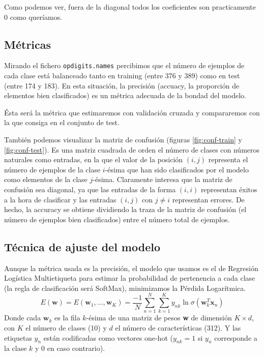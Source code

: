 \documentclass[a4]{article}
\begin{document}
Como podemos ver, fuera de la diagonal todos los coeficientes son
practicamente 0 como queríamos.

\subsection{Métricas}

Mirando el fichero \texttt{opdigits.names} percibimos que el número de
ejemplos de cada clase está balanceado tanto en training (entre 376 y
389) como en test (entre 174 y 183). En esta situación, la precisión
(accuacy, la proporción de elementos bien clasificados) es un métrica
adecuada de la bondad del modelo.

Ésta será la métrica que estimaremos con validación cruzada y
compararemos con la que consiga en el conjunto de test.

También podemos visualizar la matriz de confusión (figuras
\ref{fig:conf-train} y \ref{fig:conf-test}). Es una matriz cuadrada de
orden el número de clases con números naturales como entradas, en la
que el valor de la posición $(i,j)$ representa el número de ejemplos
de la clase $i$-ésima que han sido clasificados por el modelo como
elementos de la clase $j$-ésima. Claramente interesa que la matriz de
confusión sea diagonal, ya que las entradas de la forma $(i,i)$
representan éxitos a la hora de clasificar y las entradas $(i,j)$ con
$j\neq i$ representan errores. De hecho, la accuracy se obtiene
dividiendo la traza de la matriz de confusión (el número de ejemplos
bien clasificados) entre el número total de ejemplos.

\subsection{Técnica de ajuste del modelo}

Aunque la métrica usada es la precisión, el modelo que usamos es el de
Regresión Logística Multietiqueta para estimar la probabilidad de
pertenencia a cada clase (la regla de clasificación será SoftMax),
minimizamos la Pérdida Logarítmica. \vspace{-2mm}
\[E(\textbf{w})=E(\textbf{w}_1,\ldots,\textbf{w}_K)=\frac{-1}{N}\sum_{n=1}^N\sum_{k=1}^{K}y_{nk}\ln\sigma(\textbf{w}_k^T \textbf{x}_n)\]
Donde cada $\textbf{w}_k$ es la fila $k$-ésima de una matriz de pesos
\textbf{w} de dimensión $K\times d$, con $K$ el número de clases (10)
y $d$ el número de características (312). Y las etiquetas $y_n$ están
codificadas como vectores one-hot ($y_{nk}=1$ si $y_n$ corresponde a
la clase $k$ y 0 en caso contrario).
\end{document}
